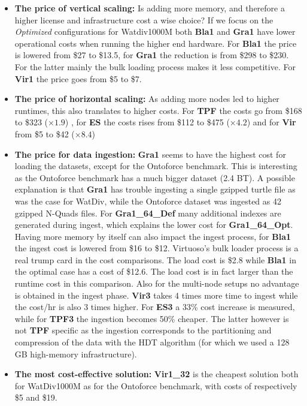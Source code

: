 \begin{itemize}
	\item \textbf{The price of vertical scaling:} Is adding more memory, and therefore a higher license and infrastructure cost a wise choice? If we focus on the \emph{Optimized} configurations for Watdiv1000M both \textbf{Bla1} and \textbf{Gra1} have lower operational costs when running the higher end hardware. For \textbf{Bla1} the price is lowered from \$27 to \$13.5, for \textbf{Gra1} the reduction is from \$298 to \$230. For the latter mainly the bulk loading process makes it less competitive. For \textbf{Vir1} the price goes from \$5 to \$7.
	
	\item \textbf{The price of horizontal scaling:} As adding more nodes led to higher runtimes, this also translates to higher costs. For \textbf{TPF} the costs go from \$168 to \$323 ($\times 1.9$) , for \textbf{ES} the costs rises from \$112 to \$475 ($\times 4.2$) and for \textbf{Vir} from \$5 to \$42 ($\times 8.4$) 

	\item \textbf{The price for data ingestion:} \textbf{Gra1} seems to have the highest cost for loading the datasets, except for the Ontoforce benchmark. This is interesting as the Ontoforce benchmark has a much bigger dataset (2.4 BT). A possible explanation is that \textbf{Gra1} has trouble ingesting a single gzipped turtle file as was the case for WatDiv, while the Ontoforce dataset was ingested as 42 gzipped N-Quads files.
    For \textbf{Gra1\_64\_Def} many additional indexes are generated during ingest, which explains the lower cost for \textbf{Gra1\_64\_Opt}. Having more memory by itself can also impact the ingest process, for \textbf{Bla1} the ingest cost is lowered from \$16 to \$12. Virtuoso's bulk loader process is a real trump 
    card in the cost comparisons. The load cost is \$2.8 while \textbf{Bla1} in the optimal case has a cost of \$12.6. The load cost is in fact larger than the runtime cost in this comparison.
    Also for the multi-node setups no advantage is obtained in the ingest phase. \textbf{Vir3} takes 4 times more time to ingest while the cost/hr is also 3 times higher. For \textbf{ES3} a 33\% cost increase is measured, while for \textbf{TPF3} the ingestion becomes 50\% cheaper. The latter however is not \textbf{TPF} specific as the ingestion corresponds to the partitioning and compression of the data with the HDT algorithm (for which we used a 128 GB high-memory infrastructure).

	\item \textbf{The most cost-effective solution:} \textbf{Vir1\_32} is the cheapest solution both for WatDiv1000M as for the Ontoforce benchmark, with costs of respectively \$5 and  \$19. 
\end{itemize}
